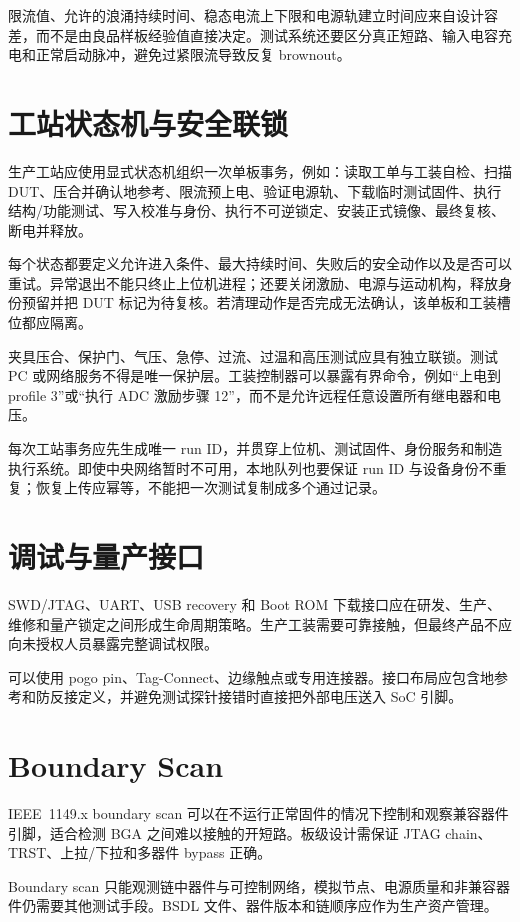 限流值、允许的浪涌持续时间、稳态电流上下限和电源轨建立时间应来自设计容差，而不是由良品样板经验值直接决定。测试系统还要区分真正短路、输入电容充电和正常启动脉冲，避免过紧限流导致反复 brownout。

\section{工站状态机与安全联锁}

生产工站应使用显式状态机组织一次单板事务，例如：读取工单与工装自检、扫描 DUT、压合并确认地参考、限流预上电、验证电源轨、下载临时测试固件、执行结构/功能测试、写入校准与身份、执行不可逆锁定、安装正式镜像、最终复核、断电并释放。

每个状态都要定义允许进入条件、最大持续时间、失败后的安全动作以及是否可以重试。异常退出不能只终止上位机进程；还要关闭激励、电源与运动机构，释放身份预留并把 DUT 标记为待复核。若清理动作是否完成无法确认，该单板和工装槽位都应隔离。

夹具压合、保护门、气压、急停、过流、过温和高压测试应具有独立联锁。测试 PC 或网络服务不得是唯一保护层。工装控制器可以暴露有界命令，例如“上电到 profile 3”或“执行 ADC 激励步骤 12”，而不是允许远程任意设置所有继电器和电压。

每次工站事务应先生成唯一 run ID，并贯穿上位机、测试固件、身份服务和制造执行系统。即使中央网络暂时不可用，本地队列也要保证 run ID 与设备身份不重复；恢复上传应幂等，不能把一次测试复制成多个通过记录。

\section{调试与量产接口}

SWD/JTAG、UART、USB recovery 和 Boot ROM 下载接口应在研发、生产、维修和量产锁定之间形成生命周期策略。生产工装需要可靠接触，但最终产品不应向未授权人员暴露完整调试权限。

可以使用 pogo pin、Tag-Connect、边缘触点或专用连接器。接口布局应包含地参考和防反接定义，并避免测试探针接错时直接把外部电压送入 SoC 引脚。

\section{Boundary Scan}

IEEE~1149.x boundary scan 可以在不运行正常固件的情况下控制和观察兼容器件引脚，适合检测 BGA 之间难以接触的开短路\cite{ieee-1149-1}。板级设计需保证 JTAG chain、TRST、上拉/下拉和多器件 bypass 正确。

Boundary scan 只能观测链中器件与可控制网络，模拟节点、电源质量和非兼容器件仍需要其他测试手段。BSDL 文件、器件版本和链顺序应作为生产资产管理。

